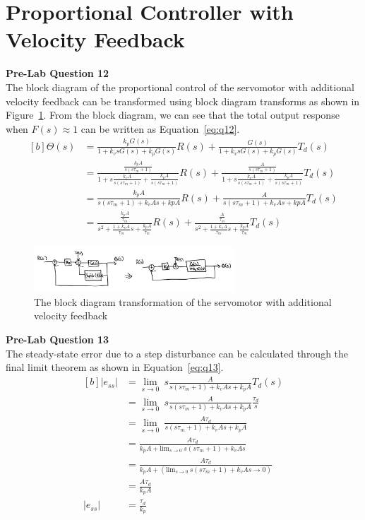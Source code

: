 \documentclass[12pt]{article}
\begin{document}
\section{Proportional Controller with Velocity Feedback}
\textbf{Pre-Lab Question 12} \\
The block diagram of the proportional control of the servomotor with additional velocity feedback can be transformed using block diagram transforms as shown in Figure~\ref{fig:q12}. From the block diagram, we can see that the total output response when $F(s) \approx 1$ can be written as Equation~\ref{eq:q12}.
\begin{equation} \label{eq:q12}
\begin{aligned}[b]
    \Theta(s) &= \frac{k_pG(s)}{1 + k_vsG(s) + k_pG(s)}R(s) + \frac{G(s)}{1 + k_vsG(s) + k_pG(s)}T_d(s) \\
    &= \frac{\frac{k_pA}{s(s\tau_m + 1)}}{1 + s\frac{k_vA}{s(s\tau_m + 1)} + \frac{k_pA}{s(s\tau_m + 1)}}R(s) + \frac{\frac{A}{s(s\tau_m + 1)}}{1 + s\frac{k_vA}{s(s\tau_m + 1)} + \frac{k_pA}{s(s\tau_m + 1)}}T_d(s) \\
    &= \frac{k_pA}{s(s\tau_m + 1) + k_vAs + kpA}R(s) + \frac{A}{s(s\tau_m + 1) + k_vAs + kpA}T_d(s) \\
    &= \frac{\frac{k_pA}{\tau_m}}{s^2 + \frac{1+k_vA}{\tau_m}s + \frac{k_pA}{\tau_m}}R(s) + \frac{\frac{A}{\tau_m}}{s^2 + \frac{1+k_vA}{\tau_m}s + \frac{k_pA}{\tau_m}}T_d(s)
\end{aligned}
\end{equation}
\begin{figure}[h!]
    \centering
    \includegraphics[width=0.67\textwidth]{q12}
    \caption{\label{fig:q12}The block diagram transformation of the servomotor with additional velocity feedback}
\end{figure}

\textbf{Pre-Lab Question 13} \\
The steady-state error due to a step disturbance can be calculated through the final limit theorem as shown in Equation~\ref{eq:q13}.
\begin{equation} \label{eq:q13}
\begin{aligned}[b]
    \left|e_{ss}\right| &= \lim_{s \to 0} \ s\frac{A}{s(s\tau_m+1) + k_vAs + k_pA}T_d(s) \\
    &= \lim_{s \to 0} \ s\frac{A}{s(s\tau_m+1) + k_vAs + k_pA}\frac{\tau_d}{s} \\
    &= \lim_{s \to 0} \ \frac{A\tau_d}{s(s\tau_m+1) + k_vAs + k_pA} \\
    &= \frac{A\tau_d}{k_pA + \text{lim}_{s \to 0} \ s(s\tau_m+1) + k_vAs} \\
    &= \frac{A\tau_d}{k_pA + (\text{lim}_{s \to 0} \ s(s\tau_m+1) + k_vAs \to 0)} \\
    &= \frac{A\tau_d}{k_pA} \\
    \left|e_{ss}\right|&= \frac{\tau_d}{k_p}
\end{aligned}
\end{equation} 
\end{document}
